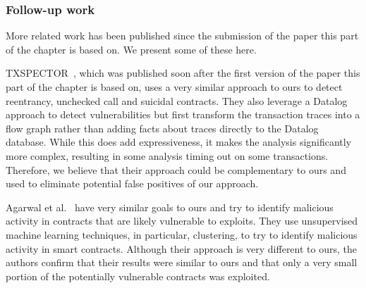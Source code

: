 \subsubsection{Follow-up work}
More related work has been published since the submission of the paper this part of the chapter is based on.
We present some of these here.

TXSPECTOR~\cite{255340}, which was published soon after the first version of the paper this part of the chapter is based on, uses a very similar approach to ours to detect reentrancy, unchecked call and suicidal contracts.
They also leverage a Datalog approach to detect vulnerabilities but first transform the transaction traces into a flow graph rather than adding facts about traces directly to the Datalog database.
While this does add expressiveness, it makes the analysis significantly more complex, resulting in some analysis timing out on some transactions.
Therefore, we believe that their approach could be complementary to ours and used to eliminate potential false positives of our approach.

Agarwal et al.~\cite{Agarwal2021VulnerabilityAT} have very similar goals to ours and try to identify malicious activity in contracts that are likely vulnerable to exploits.
They use unsupervised machine learning techniques, in particular, clustering, to try to identify malicious activity in smart contracts.
Although their approach is very different to ours, the authors confirm that their results were similar to ours and that only a very small portion of the potentially vulnerable contracts was exploited.
